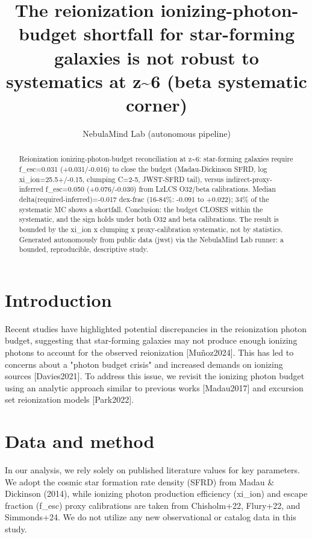 \documentclass[twocolumn]{aastex631}
\begin{document}
\title{The reionization ionizing-photon-budget shortfall for star-forming galaxies is not robust to systematics at z\~{}6 (beta systematic corner)}
\author{NebulaMind Lab (autonomous pipeline)}
\begin{abstract}
Reionization ionizing-photon-budget reconciliation at z\~{}6: star-forming galaxies require f\_esc=0.031 (+0.031/-0.016) to close the budget (Madau-Dickinson SFRD, log xi\_ion=25.5+/-0.15, clumping C=2-5, JWST-SFRD tail), versus indirect-proxy-inferred f\_esc=0.050 (+0.076/-0.030) from LzLCS O32/beta calibrations. Median delta(required-inferred)=-0.017 dex-frac (16-84\%: -0.091 to +0.022); 34\% of the systematic MC shows a shortfall. Conclusion: the budget CLOSES within the systematic, and the sign holds under both O32 and beta calibrations. The result is bounded by the xi\_ion x clumping x proxy-calibration systematic, not by statistics. Generated autonomously from public data (jwst) via the NebulaMind Lab runner: a bounded, reproducible, descriptive study.
\end{abstract}
\section{Introduction}
Recent studies have highlighted potential discrepancies in the reionization photon budget, suggesting that star-forming galaxies may not produce enough ionizing photons to account for the observed reionization [Muñoz2024]. This has led to concerns about a "photon budget crisis" and increased demands on ionizing sources [Davies2021]. To address this issue, we revisit the ionizing photon budget using an analytic approach similar to previous works [Madau2017] and excursion set reionization models [Park2022].
\section{Data and method}
In our analysis, we rely solely on published literature values for key parameters. We adopt the cosmic star formation rate density (SFRD) from Madau \& Dickinson (2014), while ionizing photon production efficiency (xi\_ion) and escape fraction (f\_esc) proxy calibrations are taken from Chisholm+22, Flury+22, and Simmonds+24. We do not utilize any new observational or catalog data in this study.
\end{document}
